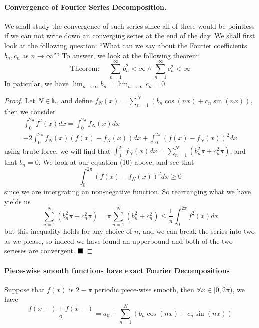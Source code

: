 \documentclass[11pt]{article}
\newcommand{\qed}[0]{$\hfill\blacksquare$}
\begin{document}
\paragraph{Convergence of Fourier Series Decomposition.} We shall study the convergence of such series since 
all of these would be pointless if we can not write down an converging series at the end of the day. We shall first look at 
the following question: ``What can we say about the Fourier coefficients $b_n, c_n$ as $n\rightarrow \infty$''?
To answer, we look at the following theorem:
\begin{equation*}
    \text{Theorem:}~~~~~~\sum_{n=1}^\infty b^2_n < \infty \land \sum_{n=1}^\infty c^2_n < \infty 
\end{equation*}
In paticular, we have $\lim_{n\rightarrow \infty}b_n = \lim_{n\rightarrow \infty}c_n = 0$.\newline
\begin{proof}
    Let $N\in \mathbb{N}$, and define $f_N(x) = \sum_{n=1}^N\left(b_n\cos(nx) + c_n\sin(nx)\right)$, then we consider
    \begin{multline}
        \int_0^{2\pi}f^2(x)dx = \int_0^{2\pi}f_N(x)dx \\+ 2\int_0^{2\pi}f_N(x)(f(x)-f_N(x))dx + \int_0^{2\pi}\left(f(x) - f_N(x)\right)^2dx
    \end{multline}
    using brute force, we will find that $\int_0^{2\pi}f_N(x)dx = \sum_{n=1}^N\left( b^2_n\pi + c_n^2\pi \right)$, and that $b_n = 0$.
    We look at our equation (10) above, and see that $$\int_0^{2\pi}\left(f(x) - f_N(x)\right)^2dx \geq 0$$ since we are intergrating an non-negative function. So rearranging what we have yields us
    \begin{equation*}
        \sum_{n=1}^N\left( b^2_n\pi + c_n^2\pi \right) = \pi\sum_{n=1}^N\left( b^2_n + c_n^2 \right) \leq \frac{1}{\pi}\int_0^{2\pi}f^2(x)dx
    \end{equation*}
    but this inequality holds for any choice of $n$, and we can break the series into two as we please, so indeed we have found an upperbound and both of the two serieses are convergent. \qed
\end{proof}

\paragraph{Piece-wise smooth functions have exact Fourier Decompositions} Suppose that $f(x)$ is $2-\pi$ periodic piece-wise smooth, then $\forall x\in [0, 2\pi)$, we have $$\frac{f(x+) + f(x-)}{2} = a_0 + \sum_{n=1}^N\left(b_n\cos(nx) + c_n\sin(nx)\right)$$
\end{document}
